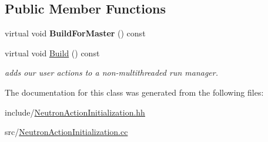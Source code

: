 \subsection*{Public Member Functions}
\begin{DoxyCompactItemize}
\item 
\mbox{\label{classNeutronActionInitialization_ab2f0627113890a43d8af4c2a45e96221}} 
virtual void {\bfseries Build\+For\+Master} () const
\item 
\mbox{\label{classNeutronActionInitialization_adc68464246541e3f72e3674bd235f658}} 
virtual void \hyperlink{classNeutronActionInitialization_adc68464246541e3f72e3674bd235f658}{Build} () const
\begin{DoxyCompactList}\small\item\em adds our user actions to a non-\/multithreaded run manager. \end{DoxyCompactList}\end{DoxyCompactItemize}


The documentation for this class was generated from the following files\+:\begin{DoxyCompactItemize}
\item 
include/\hyperlink{NeutronActionInitialization_8hh}{Neutron\+Action\+Initialization.\+hh}\item 
src/\hyperlink{NeutronActionInitialization_8cc}{Neutron\+Action\+Initialization.\+cc}\end{DoxyCompactItemize}
